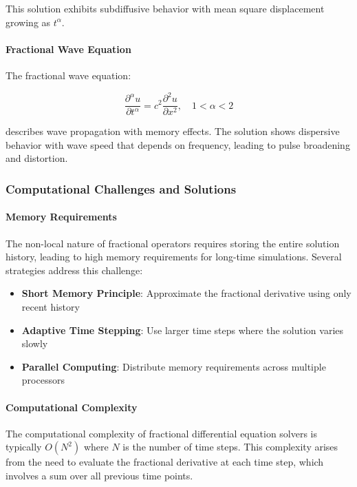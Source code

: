 This solution exhibits subdiffusive behavior with mean square displacement growing as $t^{\alpha}$.

\paragraph{Fractional Wave Equation}

The fractional wave equation:

\begin{equation}
\frac{\partial^{\alpha} u}{\partial t^{\alpha}} = c^2 \frac{\partial^2 u}{\partial x^2}, \quad 1 < \alpha < 2
\end{equation}

describes wave propagation with memory effects. The solution shows dispersive behavior with wave speed that depends on frequency, leading to pulse broadening and distortion.

\subsubsection{Computational Challenges and Solutions}

\paragraph{Memory Requirements}

The non-local nature of fractional operators requires storing the entire solution history, leading to high memory requirements for long-time simulations. Several strategies address this challenge:

\begin{itemize}
    \item \textbf{Short Memory Principle}: Approximate the fractional derivative using only recent history
    \item \textbf{Adaptive Time Stepping}: Use larger time steps where the solution varies slowly
    \item \textbf{Parallel Computing}: Distribute memory requirements across multiple processors
\end{itemize}

\paragraph{Computational Complexity}

The computational complexity of fractional differential equation solvers is typically $O(N^2)$ where $N$ is the number of time steps. This complexity arises from the need to evaluate the fractional derivative at each time step, which involves a sum over all previous time points.

